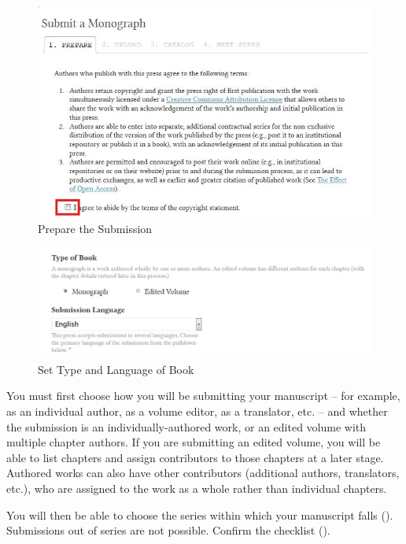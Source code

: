 \begin{figure}[h]
\centering
\includegraphics[width=1\textwidth]{./img/submission-1.jpg}
\caption{Prepare the Submission}
\label{fig:submission1}
\end{figure}

\begin{figure}[h]
\centering
\includegraphics[width=1\textwidth]{./img/submission-2.jpg}
\caption{Set Type and Language of Book}
\label{fig:submission2}
\end{figure}

You must first choose how you will be submitting your manuscript -- for example, as an individual author, as a volume editor, as a translator, etc. -- and whether the submission is an individually-authored work, or an edited volume with multiple chapter authors. If you are submitting an edited volume, you will be able to list chapters and assign contributors to those chapters at a later stage. Authored works can also have other contributors (additional authors, translators, etc.), who are assigned to the work as a whole rather than individual chapters.


You will then be able to choose the series within which your manuscript falls (). 
Submissions out of series are not possible.
Confirm the checklist ().

